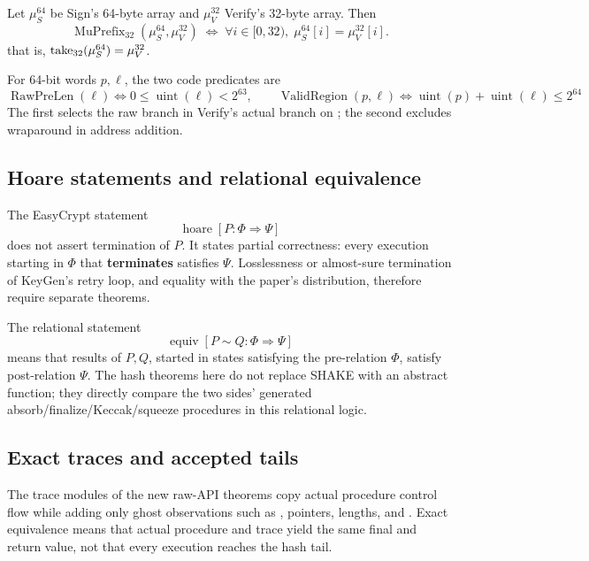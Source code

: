 \begin{definition}[\(\mu\) prefix]
\label{def:mu-prefix}
Let \(\mu_S^{64}\) be Sign's 64-byte array and \(\mu_V^{32}\) Verify's
32-byte array. Then
\[
  \operatorname{MuPrefix}_{32}(\mu_S^{64},\mu_V^{32})
  \;\Longleftrightarrow\;
  \forall i\in[0,32),\;\mu_S^{64}[i]=\mu_V^{32}[i].
\]
that is, \(\mathop{\mathrm{take}}_{32}(\mu_S^{64})=\mu_V^{32}\).
\end{definition}

\begin{definition}
\label{def:raw-region}
For 64-bit words \(p,\ell\), the two code predicates are
\[
  \operatorname{RawPreLen}(\ell)
    \Longleftrightarrow 0\le\operatorname{uint}(\ell)<2^{63},
  \qquad
  \operatorname{ValidRegion}(p,\ell)
    \Longleftrightarrow
    \operatorname{uint}(p)+\operatorname{uint}(\ell)\le 2^{64}
\]
The first selects the raw branch in Verify's actual branch on
; the second excludes wraparound in address addition.
\end{definition}

\subsection{Hoare statements and relational equivalence}

The EasyCrypt statement
\[
  \operatorname{hoare}[P:\Phi\Longrightarrow\Psi]
\]
does not assert termination of \(P\). It states partial correctness: every
execution starting in \(\Phi\) that \textbf{terminates} satisfies \(\Psi\).
Losslessness or almost-sure termination of KeyGen's retry loop, and equality
with the paper's distribution, therefore require separate theorems.

The relational statement
\[
  \operatorname{equiv}[P\sim Q:\Phi\Longrightarrow\Psi]
\]
means that results of \(P,Q\), started in states satisfying the pre-relation
\(\Phi\), satisfy post-relation \(\Psi\). The hash theorems here do not replace
SHAKE with an abstract function; they directly compare the two sides' generated
absorb/finalize/Keccak/squeeze procedures in this relational logic.

\subsection{Exact traces and accepted tails}

The trace modules of the new raw-API theorems copy actual procedure control
flow while adding only ghost observations such as ,
pointers, lengths, and . Exact equivalence means
that actual procedure and trace yield the same final 
and return value, not that every execution reaches the hash tail.

